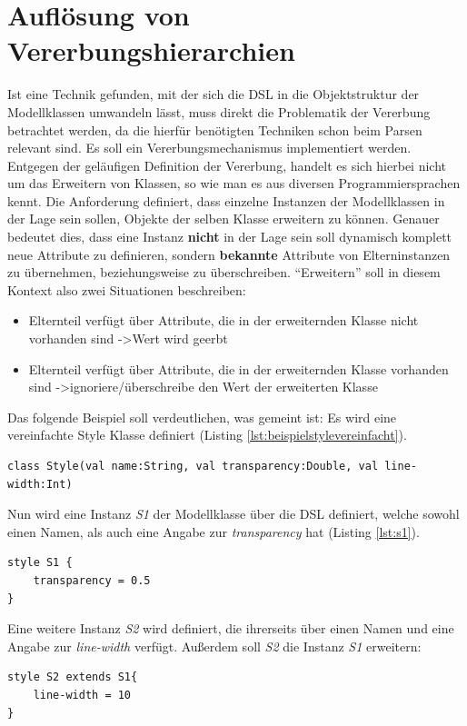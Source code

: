\section{Auflösung von Vererbungshierarchien}
Ist eine Technik gefunden, mit der sich die DSL in die Objektstruktur der Modellklassen umwandeln lässt, muss direkt die Problematik der Vererbung betrachtet werden, da die hierfür benötigten Techniken schon beim Parsen relevant sind. Es soll ein Vererbungsmechanismus implementiert werden. Entgegen der geläufigen Definition der Vererbung, handelt es sich hierbei nicht um das Erweitern von Klassen, so wie man es aus diversen Programmiersprachen kennt. Die Anforderung definiert, dass einzelne Instanzen der Modellklassen in der Lage sein sollen, Objekte der selben Klasse erweitern zu können. Genauer bedeutet dies, dass eine Instanz \textbf{nicht} in der Lage sein soll dynamisch komplett neue Attribute zu definieren, sondern \textbf{bekannte} Attribute von Elterninstanzen zu übernehmen, beziehungsweise zu überschreiben. "`Erweitern"' soll in diesem Kontext also zwei Situationen beschreiben:
\begin{itemize}
\item Elternteil verfügt über Attribute, die in der erweiternden Klasse nicht vorhanden sind -\textgreater Wert wird geerbt
\item Elternteil verfügt über Attribute, die in der erweiternden Klasse vorhanden sind -\textgreater ignoriere/überschreibe den Wert der erweiterten Klasse
\end{itemize}
Das folgende Beispiel soll verdeutlichen, was gemeint ist:
Es wird eine vereinfachte Style Klasse definiert (Listing \ref{lst:beispielstylevereinfacht}).
\begin{lstlisting}[style=scala, caption = {vereinfachte Style Klassendefinition}, label = {lst:beispielstylevereinfacht}]
class Style(val name:String, val transparency:Double, val line-width:Int)
\end{lstlisting}Nun wird eine Instanz \textit{S1} der Modellklasse über die DSL definiert, welche sowohl einen Namen, als auch eine Angabe zur \textit{transparency} hat (Listing \ref{lst:s1}).
\begin{lstlisting}[style=spray, caption = {Style S1}, label = {lst:s1}]
style S1 {
    transparency = 0.5
}
\end{lstlisting}Eine weitere Instanz \textit{S2} wird definiert, die ihrerseits über einen Namen und eine Angabe zur \textit{line-width} verfügt. Außerdem soll \textit{S2} die Instanz \textit{S1} erweitern:
\begin{lstlisting}[style=spray, caption = {Style S2}, label = {lst:s2}]
style S2 extends S1{
    line-width = 10
}
\end{lstlisting}
